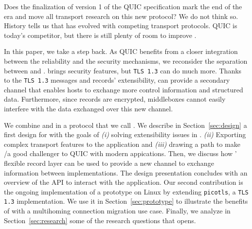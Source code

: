 Does the finalization of version 1 of the QUIC specification mark the
end of the \tcp era and move all transport research on this new protocol?
We do not think so. History tells us that \tcp has evolved with competing
transport protocols. QUIC is today's competitor, but there is still plenty of
room to improve \tcp.

In this paper, we take a step back. As QUIC benefits from a closer
integration between the reliability and the security mechanisms, we
reconsider the separation between \tcp and \tls. 
\tls brings security features, but \texttt{TLS 1.3} can do much more. 
Thanks to the \texttt{TLS 1.3} messages and records' extensibility,
\tls can provide a secondary channel that enables hosts to exchange 
more control information and structured data. 
Furthermore, since \tls records are encrypted, middleboxes
cannot easily interfere with the data exchanged over this new
channel. 

We combine \tcp and \tls in a protocol that we call \textbf{\tcpls}. We describe
in Section~\ref{sec:design} a first design for \tcpls with the goals of
\textit{(i)}
solving extensibility issues in \tcp. \textit{(ii)} Exporting complex transport features to
the application and \textit{(iii)} drawing a path to make \tcp/\tls a good challenger to QUIC
with modern appications. Then, we discuss how \tls' flexible record layer can be
used to provide a new channel to exchange information between \tcpls
implementations. The design presentation concludes with an overview of the API
to interact with the application.  Our second contribution is the ongoing
implementation of a \tcpls prototype on Linux by extending \texttt{picotls}, a
\texttt{TLS 1.3}
implementation.  We use it in Section~\ref{sec:prototype} to illustrate the
benefits of \tcpls with a multihoming connection migration use case. Finally, we
analyze in Section~\ref{sec:research} some of the research questions that \tcpls
opens. 





